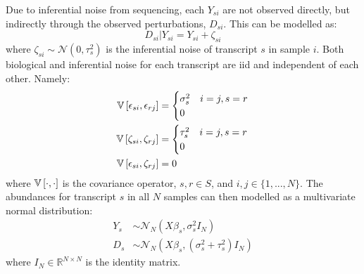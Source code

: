Due to inferential noise from sequencing, each $Y_{si}$ are not observed directly, but indirectly through the observed perturbations, $D_{si}$.
This can be modelled as:
%
\begin{equation}
  D_{si} | Y_{si} = Y_{si} + \zeta_{si}
\end{equation}
%
where $\zeta_{si} \sim \mathcal{N}(0, \tau_s^2)$ is the inferential noise of transcript $s$ in sample $i$.
Both biological and inferential noise for each transcript are \gls{iid} and independent of each other.
Namely:
%
\begin{align}
  \mathbb{V} \left[ \epsilon_{si}, \epsilon_{rj} \right] & =
  \begin{cases}
    \sigma_s^2 & i = j, s = r \\
    0
  \end{cases}                     \\
  \mathbb{V} \left[ \zeta_{si}, \zeta_{rj} \right]       & =
  \begin{cases}
    \tau_s^2 & i = j, s = r \\
    0
  \end{cases}                     \\
  \mathbb{V} \left[ \epsilon_{si}, \zeta_{rj} \right]    & = 0
\end{align}
%
where $\mathbb{V} \left[ \cdot, \cdot \right]$ is the covariance operator, $s, r \in S$, and $i, j \in \{1, ..., N \}$.
The abundances for transcript $s$ in all $N$ samples can then modelled as a multivariate normal distribution:
%
\begin{align}
  Y_{s} & \sim \mathcal{N}_N(X \beta_s, \sigma_s^2 I_{N})             \\
  D_{s} & \sim \mathcal{N}_N(X \beta_s, (\sigma_s^2 + \tau_s^2)I_{N})
\end{align}
%
where $I_N \in \mathbb{R}^{N \times N}$ is the identity matrix.

